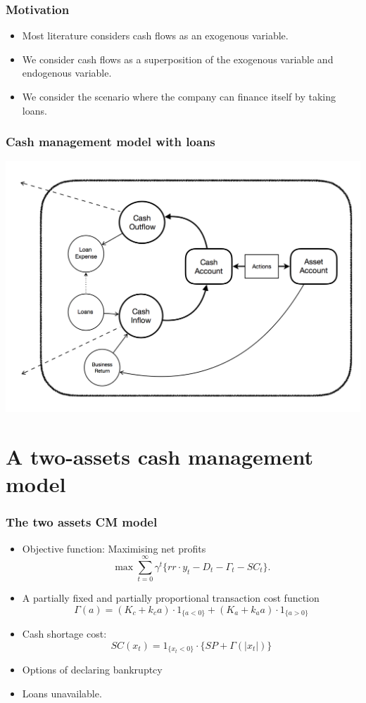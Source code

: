 \documentclass{beamer}
\begin{document}
\begin{frame}
\frametitle{Motivation}
\begin{itemize}
\item<2->Most literature considers cash flows as an exogenous variable.

\item<3->We consider cash flows as a superposition of the exogenous variable and endogenous variable.
\item<4->We consider the scenario where the company can finance itself by taking loans.


\end{itemize}


\end{frame}


\begin{frame}
\frametitle{Cash management model with loans}
\includegraphics[scale = 0.4]{loan.png}

\end{frame}

\section{A two-assets cash management model}

\begin{frame}
\frametitle{The two assets CM model}
\begin{itemize}

\item Objective function: Maximising net profits $$\max \sum^\infty _{t = 0}\gamma^t  \{ rr \cdot y_t - D_t - \Gamma_t - SC_t \}.$$
\item A partially fixed and partially proportional transaction cost function$$\Gamma(a) =  (K_c + k_c a) \cdot 1_{\{ a < 0\}} + (K_a +k_aa)\cdot 1_{\{a>0\}}$$
\item Cash shortage cost: $$SC(x_t) = 1_{\{ x_t < 0\}} \cdot \{SP+\Gamma(|x_t|) \}$$
\item Options of declaring bankruptcy
\item Loans unavailable.
\end{itemize}
\end{frame}
\end{document}
